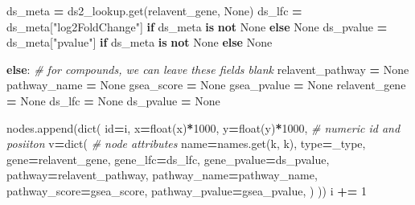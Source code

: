 \documentclass[
]{book}
\newenvironment{Shaded}{\begin{snugshade}}{\end{snugshade}}
\newcommand{\BuiltInTok}[1]{#1}
\newcommand{\CommentTok}[1]{\textcolor[rgb]{0.56,0.35,0.01}{\textit{#1}}}
\newcommand{\ControlFlowTok}[1]{\textcolor[rgb]{0.13,0.29,0.53}{\textbf{#1}}}
\newcommand{\DecValTok}[1]{\textcolor[rgb]{0.00,0.00,0.81}{#1}}
\newcommand{\KeywordTok}[1]{\textcolor[rgb]{0.13,0.29,0.53}{\textbf{#1}}}
\newcommand{\NormalTok}[1]{#1}
\newcommand{\OperatorTok}[1]{\textcolor[rgb]{0.81,0.36,0.00}{\textbf{#1}}}
\newcommand{\StringTok}[1]{\textcolor[rgb]{0.31,0.60,0.02}{#1}}
\newcommand{\VariableTok}[1]{\textcolor[rgb]{0.00,0.00,0.00}{#1}}
\begin{document}
\begin{Shaded}
\begin{Highlighting}[numbers=left,,]
\NormalTok{            ds\_meta }\OperatorTok{=}\NormalTok{ ds2\_lookup.get(relavent\_gene, }\VariableTok{None}\NormalTok{)}
\NormalTok{            ds\_lfc }\OperatorTok{=}\NormalTok{ ds\_meta[}\StringTok{"log2FoldChange"}\NormalTok{] }\ControlFlowTok{if}\NormalTok{ ds\_meta }\KeywordTok{is} \KeywordTok{not} \VariableTok{None} \ControlFlowTok{else} \VariableTok{None}
\NormalTok{            ds\_pvalue }\OperatorTok{=}\NormalTok{ ds\_meta[}\StringTok{"pvalue"}\NormalTok{] }\ControlFlowTok{if}\NormalTok{ ds\_meta }\KeywordTok{is} \KeywordTok{not} \VariableTok{None} \ControlFlowTok{else} \VariableTok{None}
        
        \ControlFlowTok{else}\NormalTok{: }\CommentTok{\# for compounds, we can leave these fields blank}
\NormalTok{            relavent\_pathway }\OperatorTok{=} \VariableTok{None}
\NormalTok{            pathway\_name }\OperatorTok{=} \VariableTok{None}
\NormalTok{            gsea\_score }\OperatorTok{=} \VariableTok{None}
\NormalTok{            gsea\_pvalue }\OperatorTok{=} \VariableTok{None}
\NormalTok{            relavent\_gene }\OperatorTok{=} \VariableTok{None}
\NormalTok{            ds\_lfc }\OperatorTok{=} \VariableTok{None}
\NormalTok{            ds\_pvalue }\OperatorTok{=} \VariableTok{None}

\NormalTok{        nodes.append(}\BuiltInTok{dict}\NormalTok{(}
            \BuiltInTok{id}\OperatorTok{=}\NormalTok{i, x}\OperatorTok{=}\BuiltInTok{float}\NormalTok{(x)}\OperatorTok{*}\DecValTok{1000}\NormalTok{, y}\OperatorTok{=}\BuiltInTok{float}\NormalTok{(y)}\OperatorTok{*}\DecValTok{1000}\NormalTok{, }\CommentTok{\# numeric id and posiiton}
\NormalTok{            v}\OperatorTok{=}\BuiltInTok{dict}\NormalTok{( }\CommentTok{\# node attributes}
\NormalTok{                name}\OperatorTok{=}\NormalTok{names.get(k, k),}
                \BuiltInTok{type}\OperatorTok{=}\NormalTok{\_type,}
\NormalTok{                gene}\OperatorTok{=}\NormalTok{relavent\_gene,}
\NormalTok{                gene\_lfc}\OperatorTok{=}\NormalTok{ds\_lfc,}
\NormalTok{                gene\_pvalue}\OperatorTok{=}\NormalTok{ds\_pvalue,}
\NormalTok{                pathway}\OperatorTok{=}\NormalTok{relavent\_pathway,}
\NormalTok{                pathway\_name}\OperatorTok{=}\NormalTok{pathway\_name,}
\NormalTok{                pathway\_score}\OperatorTok{=}\NormalTok{gsea\_score,}
\NormalTok{                pathway\_pvalue}\OperatorTok{=}\NormalTok{gsea\_pvalue,}
\NormalTok{            )}
\NormalTok{        ))}
\NormalTok{        i }\OperatorTok{+=} \DecValTok{1}
\end{Highlighting}
\end{Shaded}
\end{document}
